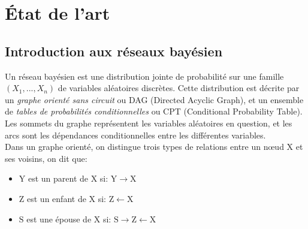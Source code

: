 \section{État de l'art}

\subsection{Introduction aux réseaux bayésien}
\label{IntroBN}

Un réseau bayésien est une distribution jointe de probabilité sur une famille \( (X_1,...,X_n) \) de variables aléatoires discrètes. Cette distribution est décrite par un \textit{graphe orienté sans circuit} ou DAG (Directed Acyclic Graph), et un ensemble de \textit{tables de probabilités conditionnelles} ou CPT (Conditional Probability Table). Les sommets du graphe représentent les variables aléatoires en question, et les arcs sont les dépendances conditionnelles entre les différentes variables.
\\
Dans un graphe orienté, on distingue trois types de relations entre un nœud \(\mathrm{X}\) et ses voisins, on dit que: 
\begin{itemize}
\centering
    \item \(\mathrm{Y}\) est un parent de \(\mathrm{X}\) si:  \quad\(\mathrm{Y} \rightarrow \mathrm{X} \)
    \item \(\mathrm{Z}\) est un enfant de \(\mathrm{X}\) si:  \quad\(\mathrm{Z} \leftarrow \mathrm{X} \)
    \item \(\mathrm{S}\) est une épouse de \(\mathrm{X}\) si:  \quad\(\mathrm{S} \rightarrow \mathrm{Z} \leftarrow \mathrm{X} \)
\end{itemize}

